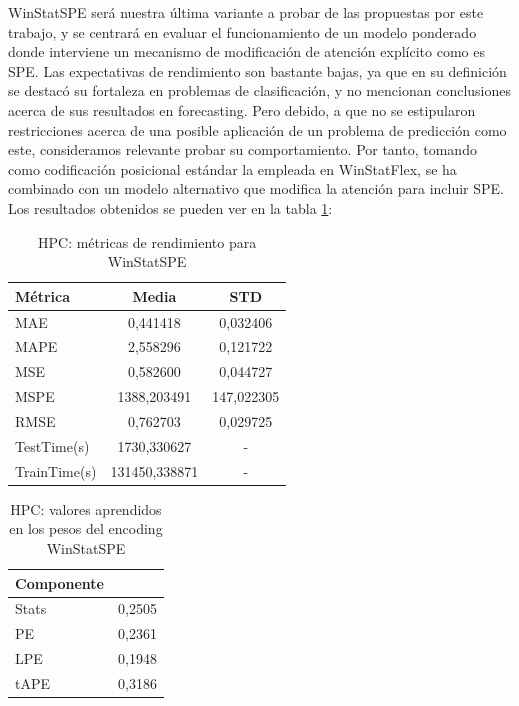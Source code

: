 WinStatSPE será nuestra última variante a probar de las propuestas por este trabajo, y se centrará en evaluar el funcionamiento de un modelo ponderado donde interviene un mecanismo de modificación de atención explícito como es SPE. Las expectativas de rendimiento son bastante bajas, ya que en su definición se destacó su fortaleza en problemas de clasificación, y no mencionan conclusiones acerca de sus resultados en forecasting. Pero debido, a que no se estipularon restricciones acerca de una posible aplicación de un problema de predicción como este, consideramos relevante probar su comportamiento. Por tanto, tomando como codificación posicional estándar la empleada en WinStatFlex, se ha combinado con un modelo alternativo que modifica la atención para incluir SPE. Los resultados obtenidos se pueden ver en la tabla \ref{hpcspe}:
\begin{table}[!ht]
	\centering
	\begin{tabular}{l|c|c}
		\toprule
		Métrica & Media & STD \\
		\midrule
		MAE & 0,441418 & 0,032406 \\
		MAPE & 2,558296 & 0,121722 \\
		MSE & 0,582600 & 0,044727 \\
		MSPE & 1388,203491 & 147,022305 \\
		RMSE & 0,762703 & 0,029725 \\
		TestTime(s) & 1730,330627 & - \\
		TrainTime(s) & 131450,338871 & - \\
		\bottomrule
	\end{tabular}
	\caption{HPC: métricas de rendimiento para WinStatSPE}
\label{hpcspe}
\end{table}


\begin{table}[!ht]
	\centering
	\begin{tabular}{l|N}
	\toprule
	Componente &  \\
	\midrule
		Stats &0,2505 \\
		PE & 0,2361 \\
		LPE &  0,1948 \\
		tAPE &  0,3186 \\
		\bottomrule
	\end{tabular}
	\caption{HPC: valores aprendidos en los pesos del encoding WinStatSPE}
	\label{hpcspepesos}
\end{table}

